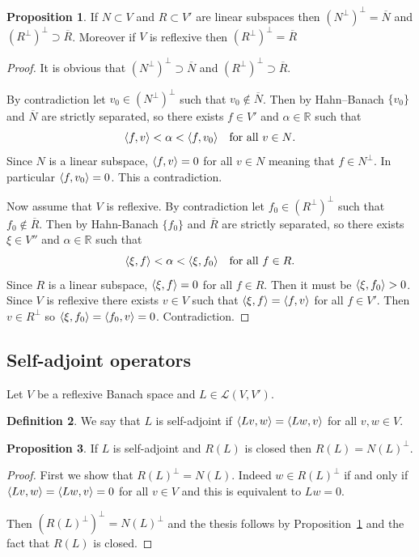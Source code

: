 \documentclass[a4paper,11pt]{article}
\theoremstyle{definition}
\newtheorem{prop}{Proposition}
\newtheorem{defi}[prop]{Definition}
\DeclarePairedDelimiter{\dual}{\langle}{\rangle}
\begin{document}
\begin{prop}
\label{prop:double-orth}
If $N\subset V$ and $R\subset V'$ are linear subspaces then $(N^\perp)^\perp=\overline{N}$ and $(R^\perp)^\perp\supset\overline{R}$. Moreover if $V$ is reflexive then $(R^\perp)^\perp=\overline{R}$
\end{prop}
\begin{proof}
It is obvious that $(N^\perp)^\perp\supset\overline{N}$ and $(R^\perp)^\perp\supset\overline{R}$.

By contradiction let $v_0\in(N^\perp)^\perp$ such that $v_0\notin\overline{N}$. Then by Hahn--Banach $\{v_0\}$ and $\overline{N}$ are strictly separated, so there exists $f\in V'$ and $\alpha\in\mathbb{R}$ such that
\[
\dual{f,v}<\alpha<\dual{f,v_0}\quad\text{for all $v\in N$}.
\]
Since $N$ is a linear subspace, $\dual{f,v}=0$ for all $v\in N$ meaning that $f\in N^\perp$. In particular $\dual{f,v_0}=0$. This a contradiction.

Now assume that $V$ is reflexive. By contradiction let $f_0\in(R^\perp)^\perp$ such that $f_0\notin\overline{R}$. Then by Hahn-Banach $\{f_0\}$ and $\overline{R}$ are strictly separated, so there exists $\xi\in V''$ and $\alpha\in\mathbb{R}$ such that
\[
\dual{\xi,f}<\alpha<\dual{\xi,f_0}\quad\text{for all $f\in R$}.
\]
Since $R$ is a linear subspace, $\dual{\xi,f}=0$ for all $f\in R$. Then it must be $\dual{\xi,f_0}>0$. Since $V$ is reflexive there exists $v\in V$ such that $\dual{\xi,f}=\dual{f,v}$ for all $f\in V'$. Then $v\in R^\perp$ so $\dual{\xi,f_0}=\dual{f_0,v}=0$. Contradiction.
\end{proof}

\subsection{Self-adjoint operators}

Let $V$ be a reflexive Banach space and $L\in\mathscr{L}(V,V')$.

\begin{defi}
We say that $L$ is self-adjoint if $\dual{Lv,w}=\dual{Lw,v}$ for all $v,w\in V$.
\end{defi}

\begin{prop}
\label{prop:range-adj}
If $L$ is self-adjoint and $R(L)$ is closed then $R(L)=N(L)^\perp$.
\end{prop}
\begin{proof}
First we show that $R(L)^\perp=N(L)$. Indeed $w\in R(L)^\perp$ if and only if $\dual{Lv,w}=\dual{Lw,v}=0$ for all $v\in V$ and this is equivalent to $Lw=0$.

Then $(R(L)^\perp)^\perp=N(L)^\perp$ and the thesis follows by Proposition~\ref{prop:double-orth} and the fact that $R(L)$ is closed.
\end{proof}
\end{document}
